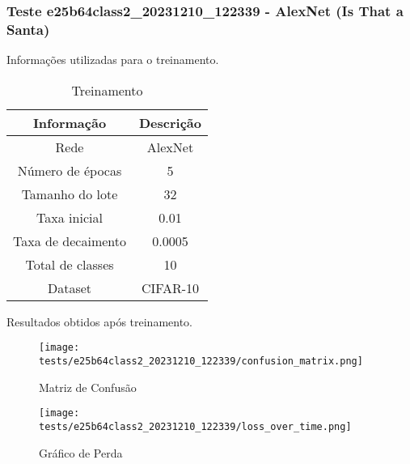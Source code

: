 \subsubsection{Teste e25b64class2_20231210_122339 - AlexNet (Is That a Santa)}

Informações utilizadas para o treinamento.

\begin{table}[ht]
   \centering
   \caption{Treinamento}
   \label{tab:modelos}
   \begin{tabular}{| c | c | }
      \hline 
      \textbf{Informação} & \textbf{Descrição} \\
      \hline \hline 
      Rede & AlexNet \\
      \hline
      Número de épocas & 5\\
      \hline
      Tamanho do lote & 32\\
      \hline
      Taxa inicial & 0.01 \\
      \hline
      Taxa de decaimento & 0.0005 \\
      \hline
      Total de classes & 10\\
      \hline
      Dataset & CIFAR-10\\
      \hline
   \end{tabular} 
\end{table}

Resultados obtidos após treinamento.


\begin{figure}[ht]
 \begin{center}
   \texttt{[image: tests/e25b64class2\_20231210\_122339/confusion\_matrix.png]}
  \caption{Matriz de Confusão}
  \label{fig:fig03}
 \end{center}
\end{figure}

\begin{figure}[ht]
 \begin{center}
   \texttt{[image: tests/e25b64class2\_20231210\_122339/loss\_over\_time.png]}
  \caption{Gráfico de Perda}
  \label{fig:fig04}
 \end{center}
\end{figure}
